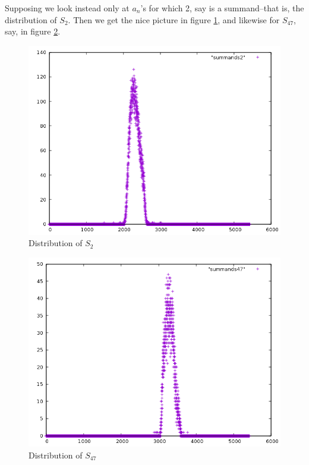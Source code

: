 \documentclass{report}
\theoremstyle{remark}
\numberwithin{equation}{section}
\begin{document}
Supposing we look instead only at $a_n$'s for which 2, say is a
summand--that is, the distribution of $S_2$.  Then we get the nice
picture in figure \ref{fig:summands2}, and likewise for $S_{47}$, say,
in figure \ref{fig:summands47}.

\begin{figure}
\caption{Distribution of $S_2$}\label{fig:summands2}
\centering
\includegraphics[scale=0.5]{../figs/summands2.png}
\end{figure}

\begin{figure}
\caption{Distribution of $S_{47}$}\label{fig:summands47}
\centering
\includegraphics[scale=0.5]{../figs/summands47.png}
\end{figure}
\end{document}
